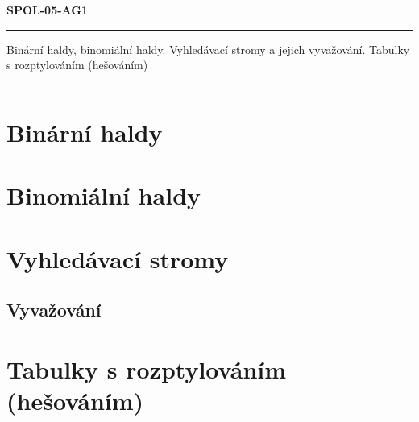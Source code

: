 \documentclass[a4paper,11pt]{article}
\begin{document}
\begin{center}
\huge\textbf{SPOL-05-AG1}
\noindent\rule{\textwidth}{0.4pt}
\Large{Binární haldy, binomiální haldy. Vyhledávací stromy a jejich vyvažování. Tabulky s rozptylováním (hešováním)}
\noindent\rule{\textwidth}{0.4pt}
\end{center}


\section{Binární haldy}
\section{Binomiální haldy}
\section{Vyhledávací stromy}
\subsection{Vyvažování}
\section{Tabulky s rozptylováním (hešováním)}
\end{document}
